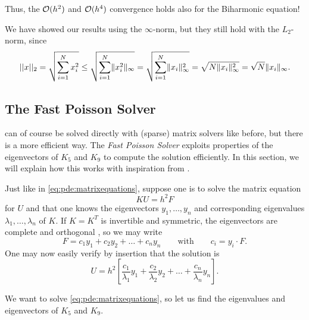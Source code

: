 Thus, the $\mathcal{O}(h^2)$ and $\mathcal{O}(h^4)$ convergence holds also for the Biharmonic equation!

We have showed our results using the $\infty$-norm, but they still hold with the $L_2$-norm, since
\begin{equation*}
	\lvert \lvert x \rvert \rvert_2 =    \sqrt{\sum_{i=1}^N x_i^2 }
	                  \leq \sqrt{\sum_{i=1}^N \lVert x_i^2 \rVert_\infty}
	                  =    \sqrt{\sum_{i=1}^N \lVert x_i \rVert_\infty^2}
	                  =    \sqrt{N            \lVert x_i \rVert_\infty^2}
	                  =    \sqrt{N}           \lVert x_i \rVert_\infty.
\end{equation*}


\subsection{The Fast Poisson Solver}
 can of course be solved directly with (sparse) matrix solvers like before, but there is a more efficient way.
The \emph{Fast Poisson Solver} exploits properties of the eigenvectors of $K_5$ and $K_9$ to compute the solution efficiently.
In this section, we will explain how this works with inspiration from \cite{Strang_2012}.

Just like in \cref{eq:pde:matrixequations}, suppose one is to solve the matrix equation 
$$
K U = h^2 F
$$
for $U$ and that one knows the eigenvectors $y_1, \dots, y_n$ and corresponding eigenvalues $\lambda_1, \dots, \lambda_n$ of $K$.
If $K = K^T$ is invertible and symmetric, the eigenvectors are complete and orthogonal \cite{owren}, so we may write
\begin{equation}
F = c_1 y_1 + c_2 y_2 + \dots + c_n y_n
\qquad \text{with} \qquad
c_i = y_i \cdot F.
\label{eq:pde:fexpansion}
\end{equation}
One may now easily verify by insertion that the solution is
\begin{equation}
U =
h^2 \left[
	\frac{c_1}{\lambda_1} y_1
	+ \frac{c_2}{\lambda_2} y_2
	+ \dots
	+ \frac{c_n}{\lambda_n} y_n
\right].
\label{eq:pde:insertionsolution}
\end{equation}

We want to solve \cref{eq:pde:matrixequations}, so let us find the eigenvalues and eigenvectors of $K_5$ and $K_9$.
\newcommand{\kroeneckerlemmatext}[2]{
	Let $\alpha_1, \dots, \alpha_m$ be eigenvalues of $A$ with corresponding eigenvectors $x_1, \dots, x_m$.
	Let $\beta_1, \dots, \beta_n$ be eigenvalues of $B$ with corresponding eigenvectors $y_1, \dots, y_n$.
	Then $\alpha_m #2 \beta_n$ are eigenvalues of $A #1 B$ with corresponding eigenvectors $x_m \otimes y_n$.
	In other words,
	\begin{equation*}
		A x_m = \alpha_m x_m
		\quad \text{and} \quad
		B y_n = \beta_n y_n
		\quad \implies \quad
		(A #1 B) (x_m \otimes y_n) = (\alpha_m #2 \beta_n) (x_m \otimes y_n)
		.
	\end{equation*}
}

